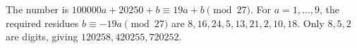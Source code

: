 The number is $100000a+20250+b\equiv19a+b\pmod{27}$. For $a=1,\ldots,9$, the required residues $b\equiv-19a\pmod{27}$ are $8,16,24,5,13,21,2,10,18$. Only $8,5,2$ are digits, giving $\boxed{120258,420255,720252}$.
